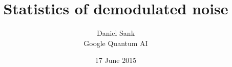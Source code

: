 \documentclass{article}
\title{Statistics of demodulated noise}
\author{Daniel Sank\\ \small{Google Quantum AI}}
\date{17 June 2015}
\begin{document}
\maketitle

\begin{abstract}

\end{abstract}

\tableofcontents




\end{document}
